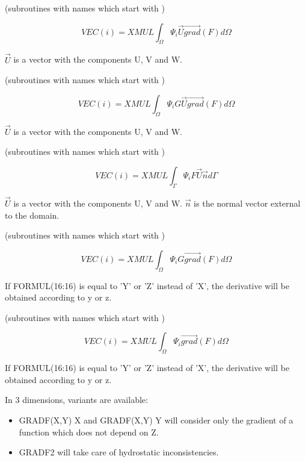 
(subroutines with names which start with )

\[VEC(i)=XMUL \int _{\Omega }\Psi _{i}  \vec{U} \overrightarrow{grad} ( F )  d\Omega  \]

$\vec{U}$ is a vector with the components U, V and W.


(subroutines with names which start with )

\[VEC(i)=XMUL \int _{\Omega }\Psi _{i}  G \vec{U} \overrightarrow{grad} ( F )  d\Omega  \]

$\vec{U}$ is a vector with the components U, V and W.


(subroutines with names which start with )

\[VEC(i)=XMUL \int _{\Gamma } \Psi _{i}   F \vec{U} \vec{n} d\Gamma  \]

$\vec{U}$ is a vector with the components U, V and W.
$\vec{n}$ is the normal vector external to the domain.


(subroutines with names which start with )

\[VEC(i)=XMUL \int _{\Omega }\Psi _{i}  G  \overrightarrow{grad} ( F )  d\Omega  \]

If FORMUL(16:16) is equal to 'Y' or 'Z' instead of 'X', the derivative will be
obtained according to y or z.


(subroutines with names which start with )

\[VEC(i)=XMUL \int _{\Omega }\Psi _{i}    \overrightarrow{grad} ( F )  d\Omega  \]

If FORMUL(16:16) is equal to 'Y' or 'Z' instead of 'X', the derivative will be
obtained according to y or z.

In 3 dimensions, variants are available:
\begin{itemize}
  \item GRADF(X,Y)     X and GRADF(X,Y)     Y will consider only the gradient
    of a function which does not depend on Z.
  \item GRADF2 will take care of hydrostatic inconsistencies.
\end{itemize}

